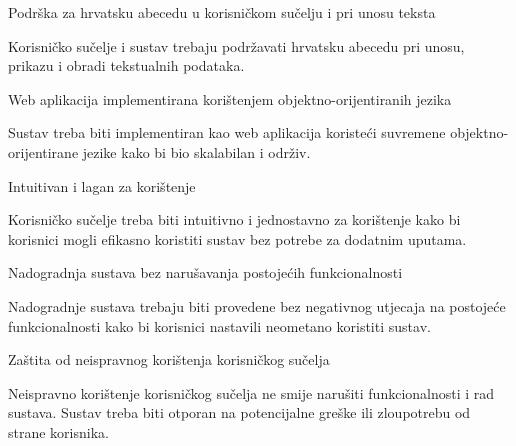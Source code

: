 \begin{packed_enum}
\begin{packed_item}
                    \end{packed_item}
                 \large \item Podrška za hrvatsku abecedu u korisničkom sučelju i pri unosu teksta \normalsize
                    \begin{packed_item}
                        \item Korisničko sučelje i sustav trebaju podržavati hrvatsku abecedu pri unosu, prikazu i obradi tekstualnih podataka.
                    \end{packed_item}
                 \large \item Web aplikacija implementirana korištenjem objektno-orijentiranih jezika \normalsize
                    \begin{packed_item}
                        \item Sustav treba biti implementiran kao web aplikacija koristeći suvremene objektno-orijentirane jezike kako bi bio skalabilan i održiv.
                    \end{packed_item}
                 \large \item Intuitivan i lagan za korištenje \normalsize
                    \begin{packed_item}
                        \item Korisničko sučelje treba biti intuitivno i jednostavno za korištenje kako bi korisnici mogli efikasno koristiti sustav bez potrebe za dodatnim uputama.
                    \end{packed_item}
                 \large \item Nadogradnja sustava bez narušavanja postojećih funkcionalnosti \normalsize
                    \begin{packed_item}
                        \item Nadogradnje sustava trebaju biti provedene bez negativnog utjecaja na postojeće funkcionalnosti kako bi korisnici nastavili neometano koristiti sustav.
                    \end{packed_item}
                 \large \item Zaštita od neispravnog korištenja korisničkog sučelja \normalsize
                    \begin{packed_item}
                        \item Neispravno korištenje korisničkog sučelja ne smije narušiti funkcionalnosti i rad sustava. Sustav treba biti otporan na potencijalne greške ili zloupotrebu od strane korisnika.
                    \end{packed_item}
                    
				
			\end{packed_enum}
			 
			 
			 
	